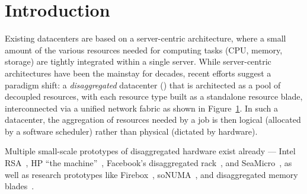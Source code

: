 \vspace{-0.1in}
\section{Introduction}
\vspace{-0.05in}
\label{sec:intro}
Existing datacenters are based on a server-centric architecture, where a small amount of the various resources needed for computing tasks (CPU, memory, storage) are tightly integrated within a single server. While server-centric architectures have been the mainstay for decades, recent efforts suggest a paradigm shift: a {\em disaggregated} datacenter (\dis) that is architected as a pool of decoupled resources, with each resource type built as a standalone resource blade, interconnected via a unified network fabric as shown in Figure~\ref{fig:dc}. In such a datacenter, the aggregation of resources needed by a job is then logical (allocated by a software scheduler) rather than physical (dictated by hardware).

Multiple small-scale prototypes of disaggregated hardware exist already --- Intel RSA~\cite{rsa}, HP ``the machine''~\cite{hptm}, Facebook's disaggregated rack~\cite{fdr}, and SeaMicro~\cite{seamicro}, as well as research prototypes like Firebox~\cite{firebox}, soNUMA~\cite{sonuma}, and disaggregated memory blades~\cite{ddcHwDesign1}.

\begin{figure}[!t]
\centering 
{}
\hfill
{}
\label{fig:dc}
\end{figure}




